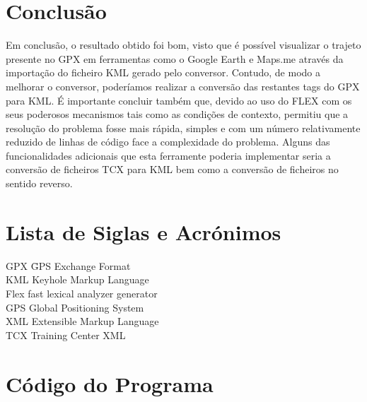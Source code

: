 \documentclass{llncs}
\begin{document}
\section{Conclusão}
Em conclusão, o resultado obtido foi bom, visto que é possível visualizar o trajeto presente no GPX em ferramentas como o Google Earth e Maps.me através da importação do ficheiro KML gerado pelo conversor. Contudo, de modo a melhorar o conversor, poderíamos realizar a conversão das restantes tags do GPX para KML. É importante concluir também que, devido ao uso do FLEX com os seus poderosos mecanismos tais como as condições de contexto, permitiu que a resolução do problema fosse mais rápida, simples e com um número relativamente reduzido de linhas de código face a complexidade do problema. Alguns das funcionalidades adicionais que esta ferramente poderia implementar seria a conversão de ficheiros TCX para KML bem como a conversão de ficheiros no sentido reverso. 

\section{Lista de Siglas e Acrónimos}
\begin{tabbing}
GPX \= GPS Exchange Format \\
KML \> Keyhole Markup Language \\
Flex \> fast lexical analyzer generator \\
GPS \> Global Positioning System \\
XML \> Extensible Markup Language \\
TCX \> Training Center XML
\end{tabbing}

\appendix
\section{Código do Programa}
\end{document}

